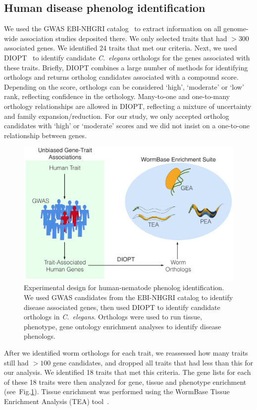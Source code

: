 \documentclass[10pt, onecolumn]{article}
\newcommand{\cel}{\emph{C.~elegans}}
\begin{document}
\subsection*{Human disease phenolog identification}
We used the GWAS EBI-NHGRI catalog~\cite{MacArthur2016} to extract information
on all genome-wide association studies deposited there. We only selected traits
that had $>300$ associated genes. We identified 24 traits that met our criteria.
Next, we used DIOPT~\cite{Hu2011} to identify candidate \cel{} orthologs for the genes
associated with these traits. Briefly, DIOPT combines a large number of methods
for identifying orthologs and returns ortholog candidates associated with a
compound score. Depending on the score, orthologs can be considered `high',
`moderate' or `low' rank, reflecting confidence in the orthology. Many-to-one and
one-to-many orthology relationships are allowed in DIOPT, reflecting a mixture of
uncertainty and family expansion/reduction. For our study, we only accepted
ortholog candidates with `high' or `moderate' scores and we did not insist on a
one-to-one relationship between genes.

\begin{figure}[htbp]
  \renewcommand{\familydefault}{\sfdefault}\normalfont{}
  \centering
  \includegraphics[width=.5\linewidth]{gwas-design.pdf}
  \caption{Experimental design for human-nematode phenolog identification.
           We used GWAS candidates from the EBI-NHGRI catalog to identify
           disease associated genes, then used DIOPT to identify candidate
           orthologs in \cel{}. Orthologs were used to run tissue, phenotype,
           gene ontology enrichment analyses to identify disease
           phenologs.}
\label{fig:gwas}
\end{figure}


After we identified worm orthologs for each trait, we reassessed how many traits
still had $>100$ gene candidates, and dropped all traits that had less than this
for our analysis. We identified 18 traits that met this criteria. The gene lists
for each of these 18 traits were then analyzed for gene, tissue and phenotype
enrichment (see~Fig.\ref{fig:gwas}). Tissue enrichment was performed using the
WormBase Tissue Enrichment Analysis (TEA) tool~\cite{Angeles-Albores2016}.
\end{document}

